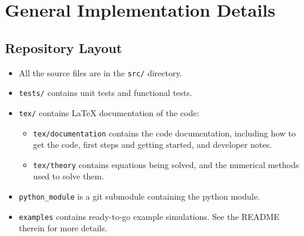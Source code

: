 \newpage



\section{General Implementation Details}



\subsection{Repository Layout}

\begin{itemize} 

    \item All the source files are in the \verb|src/| directory.

    \item \verb|tests/| contains unit tests and functional tests.
	
    \item \verb|tex/| contains LaTeX documentation of the code:

    \begin{itemize}
        \item   \verb|tex/documentation| contains the code documentation,
                including how to get the code, first steps and getting started,
                and developer notes.

        \item   \verb|tex/theory| contains equations being solved, and the 
                numerical methods used to solve them.

    \end{itemize}

    \item \verb|python_module| is a git submodule containing the
                \mhutils python module.

    \item \verb|examples| contains ready-to-go example simulations. See the
                README therein for more details.

\end{itemize}









